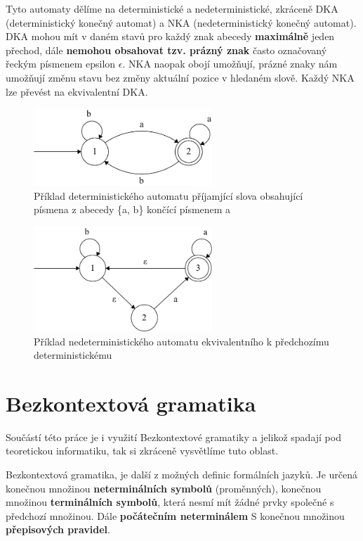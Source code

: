 Tyto automaty dělíme na deterministické a nedeterministické, zkráceně DKA (deterministický konečný automat) a NKA (nedeterministický konečný automat).
DKA mohou mít v daném stavů pro každý znak abecedy \textbf{maximálně} jeden přechod, dále \textbf{nemohou obsahovat tzv. prázný znak} často označovaný řeckým písmenem epsilon $\epsilon$.
NKA naopak obojí umožňují, prázné znaky nám umožňují změnu stavu bez změny aktuální pozice v hledaném slově. 
Každý NKA lze převést na ekvivalentní DKA.

\begin{figure}[!h]
	\centering
	\includegraphics[width=0.6\textwidth]{Figures/DFA_example.pdf}
	\caption{Příklad deterministického automatu příjamjící slova obsahující písmena z abecedy \{a, b\} končící písmenem a}
	\label{fig:DFAex}
\end{figure}

\begin{figure}[!h]
	\centering
	\includegraphics[width=0.6\textwidth]{Figures/NFA_example.pdf}
	\caption{Příklad nedeterministického automatu ekvivalentního k předchozímu deterministickému}
	\label{fig:NFAex}
\end{figure}

\section{Bezkontextová gramatika}
Součástí této práce je i využití Bezkontextové gramatiky a jelikož spadají pod teoretickou informatiku, 
tak si zkráceně vysvětlíme tuto oblast.

Bezkontextová gramatika, je další z možných definic formálních jazyků. Je určená konečnou množinou \textbf{neterminálních symbolů} (proměnných), konečnou množinou \textbf{terminálních symbolů}, která nesmí mít žádné prvky společné s předchozí množinou.
Dále \textbf{počátečním neterminálem} S konečnou množinou \textbf{přepisových pravidel}\cite{Wikipedia_2021}.

